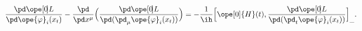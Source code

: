 \begin{equation}	\label{12.80}
\frac{\pd\ope[0\mspace{-3mu}]{L}}{\pd \ope{\varphi}_i(x_t)}
-
\frac{\pd}{\pd x^\mu}\Bigl(
	\frac{\pd\ope[0\mspace{-3mu}]{L}}{\pd(\pd_\mu\ope{\varphi}_i(x_t) )}
	 \Bigr)
 =
- \frac{1}{\ih}
\Bigl[
	\ope[0]{H}(t) ,
	\frac{\pd\ope[0\mspace{-3mu}]{L}}{\pd(\pd_t\ope{\varphi}_i(x_t) )}
\Bigr]_{\_} .
	\end{equation}

